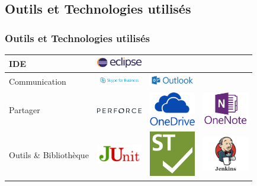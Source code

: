 \documentclass{beamer}
\begin{document}
        \subsection{Outils et Technologies utilisés}
        \begin{frame}
        \frametitle{Outils et Technologies utilisés}
            \begin{table}[l]
                \centering
                \begin{tabular}{|l|c|c|c|}
                    \hline
                    IDE & \includegraphics[width=2cm]{Eclipse_logo.png} & & \\
                    \hline
                    Communication &  \includegraphics[width=2cm]{Skype_for_Business_logo.png} & \includegraphics[width=2cm]{Outlook_logo.png} & \\
                    \hline
                    Partager & \includegraphics[width=2cm]{Perforce_Logo.jpg} & \includegraphics[width=2cm]{OneDriveLogo.png} & \includegraphics[width=2cm]{OneNoteLogo.png}\\
                    \hline
                    Outils \& Bibliothèque & \includegraphics[width=2cm]{junit-logo.png} & \includegraphics[width=2cm]{silktest_logo.png} & \includegraphics[width=2cm]{jenkins_logo.png} \\
                    \hline
                \end{tabular}
                \label{tab:my_label}
            \end{table}
        \end{frame}
        
\end{document}
